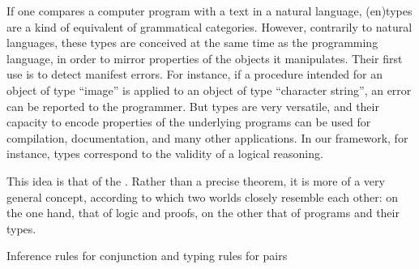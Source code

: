 If one compares a computer program with a text in a natural language,
\intro(en){types}
are a kind of equivalent of grammatical categories. However, contrarily to natural
languages, these types are conceived at the same time as the programming language, in order
to mirror properties of the objects it manipulates.
Their first use is to detect manifest errors. For instance, if a procedure
intended for an object of type “image” is applied to an object of type “character string”,
an error can be reported to the programmer.%
%
But types are very versatile, and their capacity to encode properties of the underlying
programs can be used for compilation, documentation, and many other applications. In our
framework, for instance, types correspond to the validity of a logical reasoning.

This idea is that of the .%
%
%
Rather than a precise theorem,
it is more of a very general concept, according to which two worlds closely resemble each
other: on the one hand, that of logic and proofs, on the other that of programs
and their types.

\begin{marginfigure}





  \caption{Inference rules for conjunction and typing rules for pairs}
  \label{fig:curry-howard-example-en}
\end{marginfigure}

